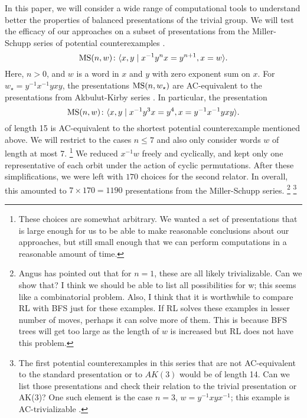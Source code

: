 In this paper, we will consider a wide range of computational tools to understand better the properties of balanced presentations of the trivial group. We will test the efficacy of our approaches on a subset of presentations from the Miller-Schupp series of potential counterexamples \cite{Miller-Schupp}.
\[
\text{MS}(n, w) \colon \langle x, y \mid x^{-1} y^n x = y^{n+1}, x = w\rangle.
\]
Here, $n > 0$, and $w$ is a word in $x$ and $y$ with zero exponent sum on $x$. For $w_\star = y^{-1} x^{-1} y x y$, the presentations $\text{MS}(n, w_\star)$ are AC-equivalent to the presentations from Akbulut-Kirby series \cite{MMS}. In particular, the presentation
\[
\text{MS}(n, w) \colon \langle x, y \mid x^{-1} y^3 x = y^{4}, x =  y^{-1} x^{-1} y x y\rangle.
\]
of length 15 is AC-equivalent to the shortest potential counterexample mentioned above. We will restrict to the cases $n \leq 7$ and also only consider words $w$ of length at most 7. 
\footnote{These choices are somewhat arbitrary. We wanted a set of presentations that is large enough for us to be able to make reasonable conclusions about our approaches, but still small enough that we can perform computations in a reasonable amount of time.  }
We reduced $x^{-1}w$ freely and cyclically, and kept only one representative of each orbit under the action of cyclic permutations. After these simplifications, we were left with $170$ choices for the second relator. In overall, this amounted to $7 \times 170 = 1190$ presentations from the Miller-Schupp series.
\footnote{Angus has pointed out that for $n=1$, these are all likely trivializable.
Can we show that? 
I think we should be able to list all possibilities for w; this seems like a combinatorial problem.
Also, I think that it is worthwhile to compare RL with BFS just for these examples. If RL solves these examples in lesser number of moves, perhaps it can solve more of them. 
This is because BFS trees will get too large as the length of $w$ is increased but RL does not have this problem.
}
\footnote{The first potential counterexamples in this series that are not AC-equivalent to the standard presentation or to $AK(3)$ would be of length 14.
Can we list those presentations and	check their relation to the trivial presentation or AK(3)? One such element is the case $n=3$, $w = y^{-1} x y x^{-1}$; this example is AC-trivializable \cite{morse}.}
\newline







 


